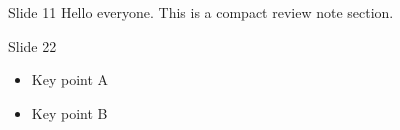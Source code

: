 \begin{CompactSlideBlock}{Slide 1}{1}
Hello everyone. This is a compact review note section.
\end{CompactSlideBlock}

\begin{CompactSlideBlock}{Slide 2}{2}
\begin{itemize}
  \item Key point A
  \item Key point B
\end{itemize}
\end{CompactSlideBlock}
